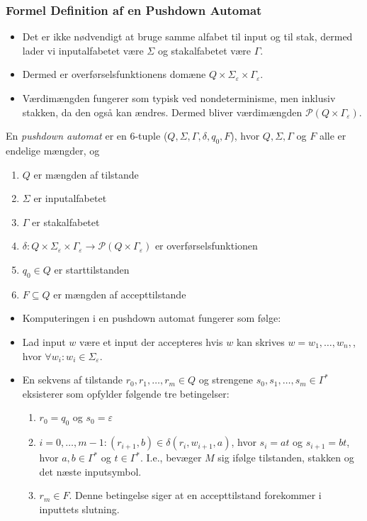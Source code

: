 \begin{frame}[allowframebreaks]
	\frametitle{Formel Definition af en Pushdown Automat}
	\begin{itemize}
		\item Det er ikke nødvendigt at bruge samme alfabet til input og til stak, dermed lader vi inputalfabetet være $\Sigma$ og stakalfabetet være $\Gamma$.
		\item Dermed er overførselsfunktionens domæne $Q \times \Sigma_{\varepsilon} \times \Gamma_{\varepsilon}$.
		\item Værdimængden fungerer som typisk ved nondeterminisme, men inklusiv stakken, da den også kan ændres. Dermed bliver værdimængden $\mathcal{P}(Q \times \Gamma_{\varepsilon})$.
	\end{itemize}

	\begin{definition}
		En \textit{pushdown automat} er en 6-tuple ($Q, \Sigma, \Gamma, \delta, q_{0}, F$), hvor $Q, \Sigma, \Gamma$ og $F$ alle er endelige mængder, og
		\begin{enumerate}
			\item $Q$ er mængden af tilstande
			\item $\Sigma$ er inputalfabetet
			\item $\Gamma$ er stakalfabetet
			\item $\delta : Q \times \Sigma_{\varepsilon} \times \Gamma_{\varepsilon} \longrightarrow \mathcal{P}(Q \times \Gamma_{\varepsilon})$ er overførselsfunktionen
			\item $q_{0} \in Q$ er starttilstanden
			\item $F \subseteq Q$ er mængden af accepttilstande
		\end{enumerate}
	\end{definition}

	\begin{itemize}
		\item Komputeringen i en pushdown automat fungerer som følge:
		\item Lad input $w$ være et input der accepteres hvis $w$ kan skrives $w = w_{1}, \ldots, w_{n}, $, hvor $\forall w_{i} : w_{i} \in \Sigma_{\varepsilon}$.
		\item En sekvens af tilstande $r_{0}, r_{1}, \ldots, r_{m} \in Q$ og strengene $s_{0}, s_{1}, \ldots, s_{m} \in \Gamma^{*}$ eksisterer som opfylder følgende tre betingelser:
		      \begin{enumerate}
			      \item $r_{0} = q_{0}$ og $s_{0} = \varepsilon$
			      \item $i = 0, \ldots, m-1 : (r_{i+1}, b) \in \delta(r_{i}, w_{i+1}, a)$, hvor $s_{i} = at$ og $s_{i+1} = bt$, hvor $a,b \in \Gamma^{*}$ og $t \in \Gamma^{*}$. I.e., bevæger $M$ sig ifølge tilstanden, stakken og det næste inputsymbol.
			      \item $r_{m} \in F$. Denne betingelse siger at en accepttilstand forekommer i inputtets slutning.
		      \end{enumerate}
	\end{itemize}
\end{frame}

